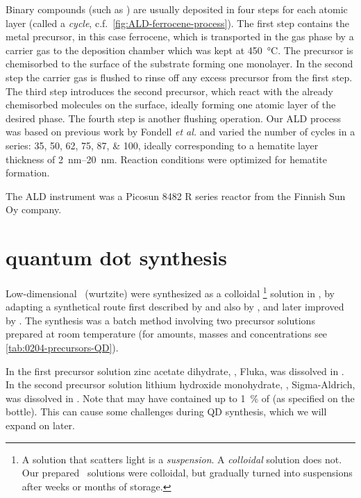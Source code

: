 \documentclass[webedition,openright,titles,swedish,english]{LuaUUThesis}\usepackage[]{graphicx}\usepackage[]{xcolor}
\newcommand{\cf}{c.f.}
\begin{document}
Binary compounds (such as \hematite) are usually deposited in
four steps for each atomic layer (called a \emph{cycle}, \cf\ \cref{fig:ALD-ferrocene-process}).
The first step contains the metal precursor, in this case ferrocene, which is
transported in the gas phase by a carrier gas to the deposition chamber
which was kept at \qty{450}{\celsius}.
The precursor is chemisorbed to the surface of the substrate forming one monolayer.
In the second step the carrier gas is flushed to rinse off any excess precursor
from the first step.
The third step introduces the second precursor, which react with the already chemisorbed
molecules on the surface, ideally forming one atomic layer of the desired phase.
The fourth step is another flushing operation.
Our \gls{ALD} process was based on previous work by Fondell \textit{et al.} \cite{Fondell2014a,Fondell2014}
and varied the number of cycles in a series: \numlist{35;50;62;75;87;100},
ideally corresponding to a hematite layer thickness of \qtyrange{2}{20}{\nm}.
Reaction conditions were optimized for hematite formation.

The \gls{ALD} instrument was a Picosun 8482 R series reactor from the Finnish Sun Oy company.




\section{\texorpdfstring{ quantum dot synthesis}{ZnO quantum dot synthesis}}
\label{synthesis:quantum-dot}

Low-dimensional \zincox\ (wurtzite)  were synthesized as a colloidal%
\footnote{%
   A solution that scatters light is a \emph{suspension}.
   A \emph{colloidal} solution does not.
   Our prepared \zincox\ solutions were colloidal, but gradually turned into suspensions
   after weeks or months of storage.
}
solution in , by adapting a
synthetical route first described by \textcite{Spanhel1991} and also
by \cite{Hoyer1993,Hoyer1994}, and later improved by \textcite{Meulenkamp1998}.
The synthesis was a batch method involving two precursor solutions
prepared at room temperature
(for amounts, masses and concentrations see \cref{tab:0204-precursors-QD}).

In the first precursor solution zinc acetate dihydrate, ,
Fluka, was dissolved in .
In the second precursor solution lithium hydroxide monohydrate,
, Sigma-Aldrich,
was dissolved in .
Note that  may
have contained up to \qty{1}{\percent} of  (as specified on the bottle).
This can cause some challenges during \gls{QD} synthesis, which we will expand on later.
\end{document}
